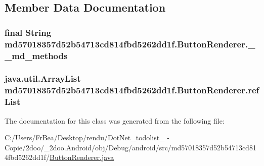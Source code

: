 \subsection{Member Data Documentation}
\hypertarget{classmd57018357d52b54713cd814fbd5262dd1f_1_1_button_renderer_07d67ace7550d930955ba79206673c60}{
\subsubsection[{\_\-\_\-md\_\-methods}]{\setlength{\rightskip}{0pt plus 5cm}final String {\bf md57018357d52b54713cd814fbd5262dd1f.ButtonRenderer.\_\-\_\-md\_\-methods}}}
\label{classmd57018357d52b54713cd814fbd5262dd1f_1_1_button_renderer_07d67ace7550d930955ba79206673c60}


\hypertarget{classmd57018357d52b54713cd814fbd5262dd1f_1_1_button_renderer_21d4015ec2fa37ea58626d27257f2727}{
\subsubsection[{refList}]{\setlength{\rightskip}{0pt plus 5cm}java.util.ArrayList {\bf md57018357d52b54713cd814fbd5262dd1f.ButtonRenderer.refList}}}
\label{classmd57018357d52b54713cd814fbd5262dd1f_1_1_button_renderer_21d4015ec2fa37ea58626d27257f2727}




The documentation for this class was generated from the following file:\begin{CompactItemize}
\item 
C:/Users/FrBea/Desktop/rendu/DotNet\_\-todolist\_ - Copie/2doo/\_\-2doo.Android/obj/Debug/android/src/md57018357d52b54713cd814fbd5262dd1f/\hyperlink{md57018357d52b54713cd814fbd5262dd1f_2_button_renderer_8java}{ButtonRenderer.java}\end{CompactItemize}
